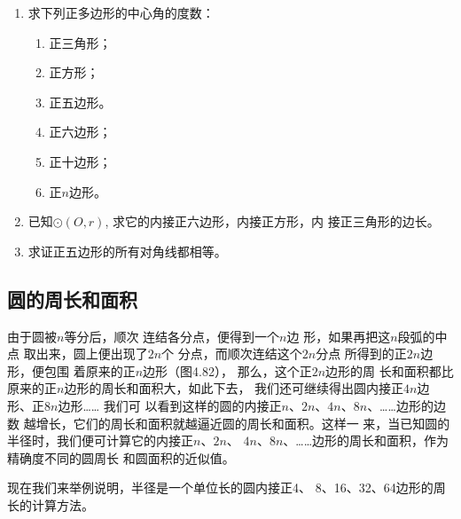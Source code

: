 \begin{ex}
\begin{enumerate}
\item  求下列正多边形的中心角的度数：
\begin{multicols}{3}
\begin{enumerate}
\item 正三角形；  \item 正方形；
\item 正五边形。
\item 正六边形；  \item 正十边形；  \item 正$n$边形。
\end{enumerate}
\end{multicols}

  \item 已知$\odot (O,r)$, 求它的内接正六边形，内接正方形，内
  接正三角形的边长。
  \item 求证正五边形的所有对角线都相等。
\end{enumerate}
\end{ex}

\subsection{圆的周长和面积}
由于圆被$n$等分后，顺次
连结各分点，便得到一个$n$边
形，如果再把这$n$段弧的中点
取出来，圆上便出现了$2n$个
分点，而顺次连结这个$2n$分点
所得到的正$2n$边形，便包围
着原来的正$n$边形（图4.82），
那么，这个正$2n$边形的周
长和面积都比原来的正$n$边形的周长和面积大，如此下去，
我们还可继续得出圆内接正$4n$边形、正$8n$边形…… 我们可
以看到这样的圆的内接正$n$、$2n$、$4n$、$8n$、……边形的边数
越增长，它们的周长和面积就越逼近圆的周长和面积。这样一
来，当已知圆的半径时，我们便可计算它的内接正$n$、$2n$、
$4n$、$8n$、……边形的周长和面积，作为精确度不同的圆周长
和圆面积的近似值。

现在我们来举例说明，半径是一个单位长的圆内接正4、
8、16、32、64边形的周长的计算方法。

\begin{figure}[htp]
  \centering
{}
  \caption{}
\end{figure}

